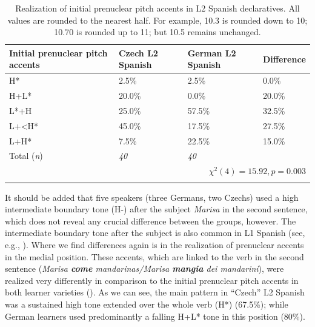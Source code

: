 \begin{table}
\begin{tabularx}{\textwidth}{lYYY}

\lsptoprule

{Initial prenuclear pitch accents} & {Czech L2 Spanish} & {German L2 Spanish} & {Difference}\\
\midrule
H* &  2.5\% &  2.5\% &  0.0\%\\
H+L* &  20.0\% &  0.0\% &  20.0\%\\
L*+H &  25.0\% &  57.5\% &  32.5\%\\
L+<H* &  45.0\% &  17.5\% &  27.5\%\\
L+H* &  7.5\% &  22.5\% &  15.0\%\\
\midrule
Total (\textit{n}) & {\itshape 40} & {\itshape 40} &  \\
\\
\lspbottomrule
\end{tabularx}

\caption{Realization of initial prenuclear pitch accents in L2 Spanish declaratives. All values are rounded to the nearest half. For example, 10.3 is rounded down to 10; 10.70 is rounded up to 11; but 10.5 remains unchanged.}
\label{tab:4.2}
\end{table}

It\largerpage{} should be added that five speakers (three Germans, two Czechs) used a high intermediate boundary tone (H-) after the subject \textit{Marisa} in the second sentence, which does not reveal any crucial difference between the groups, however. The intermediate boundary tone after the subject is also common in L1 Spanish (see, e.g., \citealt{FrotaEtAl2007}). Where we find differences again is in the realization of prenuclear accents in the medial position. These accents, which are linked to the verb in the second sentence (\textit{Marisa \textbf{come} mandarinas\slash Marisa \textbf{mangia} dei mandarini}), were realized very differently in comparison to the initial prenuclear pitch accents in both learner varieties (). As we can see, the main pattern in “Czech” L2 Spanish was a sustained high tone extended over the whole verb (H*) (67.5\%); while German learners used predominantly a falling H+L* tone in this position (80\%).

